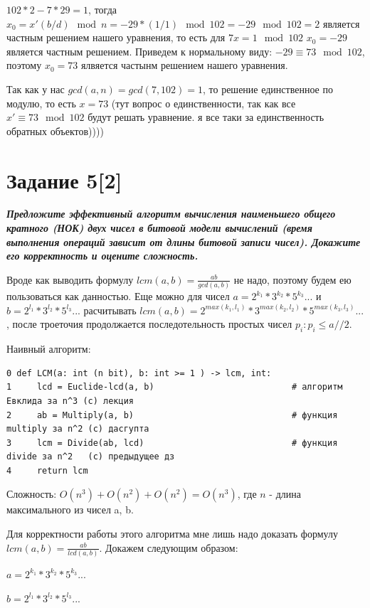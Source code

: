 \documentclass{article}
\begin{document}
$102*2 - 7*29 = 1$, тогда $x_0 = x'(b/d) \mod n = -29 * (1/1) \mod 102 = -29 \mod 102 = 2$ является частным решением нашего уравнения, то есть для $7x = 1 \mod 102$ $x_0 = -29$ является частным решением. Приведем к нормальному виду: $-29 \equiv 73 \mod 102$, поэтому $x_0 = 73$ ялвяется частынм решением нашего уравнения. 

Так как у нас $gcd(a,n) = gcd(7,102) = 1$, то решение единственное по модулю, то есть $x = 73$ (тут вопрос о единственности, так как все $x' \equiv 73 \mod 102$ будут решать уравнение. я все таки за единственность обратных объектов))))

\bigskip


\section*{\textbf{Задание 5[2]}} \textbf{\textit{Предложите эффективный алгоритм вычисления наименьшего общего кратного (НОК) двух чисел в битовой модели вычислений (время выполнения операций зависит от длины битовой записи чисел). Докажите его корректность и оцените сложность.}}

Вроде как выводить формулу $lcm(a,b) = \frac{ab}{gcd(a,b)}$ не надо, поэтому будем ею пользоваться как данностью. Еще можно для чисел $a = 2^{k_1} *3^{k_2} * 5^{k_3} ...$ и $b = 2^{l_1} *3^{l_2} * 5^{l_3} ...$ расчитывать $lcm(a,b) = 2^{max(k_1, l_1)} *3^{max(k_2, l_2)} * 5^{max(k_3, l_3)} ...$, после троеточия продолжается последотельность простых чисел $p_i : p_i \leq a//2$.

Наивный алгоритм:

\begin{verbatim}
0 def LCM(a: int (n bit), b: int >= 1 ) -> lcm, int:
1     lcd = Euclide-lcd(a, b)                           # алгоритм Евклида за n^3 (с) лекция
2     ab = Multiply(a, b)                               # функция multiply за n^2 (c) дасгупта
3     lcm = Divide(ab, lcd)                             # функция divide за n^2   (с) предыдущее дз
4     return lcm
\end{verbatim}

Сложность: $O(n^3) + O(n^2) + O(n^2) = O(n^3)$, где $n$ - длина максимального из чисел a, b.

Для корректности работы этого алгоритма мне лишь надо доказать формулу $lcm(a,b) = \frac{ab}{lcd(a,b)}$. Докажем следующим образом: 

$a = 2^{k_1} *3^{k_2} * 5^{k_3} ...$

$b = 2^{l_1} *3^{l_2} * 5^{l_3} ...$
\end{document}
